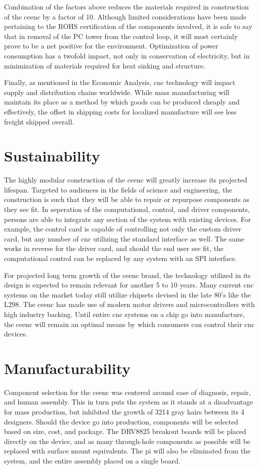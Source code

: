 Combination of the factors above reduces the materials required in construction of the \gls{ceenc} by a factor of 10. 
Although limited considerations have been made pertaining to the ROHS certification of the components involved, it is safe to say that in removal of the PC tower from the control loop, it will most certainly prove to be a net positive for the environment. 
Optimization of power consumption has a twofold impact, not only in conservation of electricity, but in minimization of materials required for heat sinking and structure.

Finally, as mentioned in the Economic Analysis, \gls{cnc} technology will impact supply and distribution chains worldwide.
While mass manufacturing will maintain its place as a method by which goods can be produced cheaply and effectively, the offset in shipping costs for localized manufacture will see less freight shipped overall.

\section{Sustainability}
The highly modular construction of the \gls{ceenc} will greatly increase its projected lifespan.
Targeted to audiences in the fields of science and engineering, the construction is such that they will be able to repair or repurpose components as they see fit.
In seperation of the computational, control, and driver components, persons are able to integrate any section of the system with existing devices.
For example, the control card is capable of controlling not only the custom driver card, but any number of \gls{cnc} utilizing the standard interface as well.
The same works in reverse for the driver card, and should the end user see fit, the computational control can be replaced by any system with an SPI interface.

For projected long term growth of the \gls{ceenc} brand, the technology utilized in its design is expected to remain relevant for another 5 to 10 years.
Many current \gls{cnc} systems on the market today still utilize chipsets devised in the late 80's like the L298. 
The \gls{ceenc} has made use of modern motor drivers and microcontrollers with high industry backing.
Until entire \gls{cnc} systems on a chip go into manufacture, the \gls{ceenc} will remain an optimal means by which consumers can control their \gls{cnc} devices.
 
\section{Manufacturability}
Component selection for the \gls{ceenc} was centered around ease of diagnosis, repair, and human assembly.
This in turn puts the system as it stands at a disadvantage for mass production, but inhibited the growth of 3214 gray hairs between its 4 designers.
Should the device go into production, components will be selected based on size, cost, and package. 
The DRV8825 breakout boards will be placed directly on the device, and as many through-hole components as possible will be replaced with surface mount equivalents.
The \gls{pi} will also be eliminated from the system, and the entire assembly placed on a single board.

